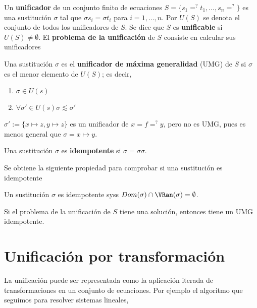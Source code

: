 \begin{defi}
  Un \textbf{unificador} de un conjunto finito de ecuaciones
  $S = \{ s_1 =^? t_1, \dots, s_n =^? \}$ es una sustitución $\sigma$
  tal que $\sigma s_i = \sigma t_i$ para $i = 1, \dots, n.$ Por $U(S)$
  se denota el conjunto de todos los unificadores de $S$. Se dice que
  $S$ es \textbf{unificable} si $U(S) \neq \emptyset$. El
  \textbf{problema de la unificación} de $S$ consiste en calcular sus
  unificadores
\end{defi}

\begin{defi} 
  Una sustitución $\sigma$ es el \textbf{unificador de máxima
    generalidad} (UMG) de $S$ si $\sigma$ es el menor elemento de
  $U(S)$; es decir,
  \begin{enumerate}
  \item $\sigma \in U(s)$
  \item $\forall \sigma' \in U(s) \sigma \lesssim \sigma'$
  \end{enumerate}
\end{defi}

\begin{ejem}
  $\sigma ' := \{ x \mapsto z, y \mapsto z \}$ es un unificador de
  $x=f =^? y$, pero no es UMG, pues es menos general que
  $\sigma = {x \mapsto y}$.
\end{ejem}

\begin{defi}
  Una sustitución $\sigma$ es \textbf{idempotente} si $\sigma = \sigma \sigma$.
\end{defi}

Se obtiene la siguiente propiedad para comprobar si una sustitución es
idempotente

\begin{defi}
  Un sustitución $\sigma$ es idempotente syss 
  $Dom(\sigma) \cap \VRan(\sigma) = \emptyset$.
\end{defi}

\begin{teor}
  Si el problema de la unificación de $S$ tiene una solución, entonces
  tiene un UMG idempotente.
\end{teor}

\section{Unificación por transformación}

La unificación puede ser representada como la aplicación iterada de
transformaciones en un conjunto de ecuaciones. Por ejemplo el
algoritmo que seguimos para resolver sistemas lineales,

